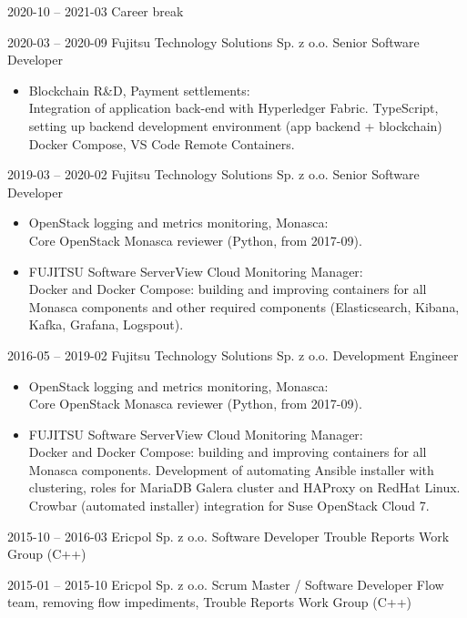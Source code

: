 \documentclass[11pt,a4paper,sans,english]{moderncv}   %
\begin{document}
\cventry
{\small2020-10 -- 2021-03}
	{Career break}{}{}{}{}

\cventry
{\small2020-03 -- 2020-09}
	{Fujitsu Technology Solutions Sp. z o.o.}{}{}
	{Senior Software Developer}
	{\begin{itemize}
		\item Blockchain R\&D, Payment settlements: \\
			Integration of application back-end with Hyperledger Fabric.
			TypeScript, setting up backend development environment (app backend
			+ blockchain) Docker Compose, VS Code Remote Containers.
	\end{itemize}}

\cventry
{\small2019-03 -- 2020-02}
	{Fujitsu Technology Solutions Sp. z o.o.}{}{}
	{Senior Software Developer}
	{\begin{itemize}
		\item  OpenStack logging and metrics monitoring, Monasca: \\
			Core OpenStack Monasca reviewer (Python, from 2017-09).
		\item  FUJITSU Software ServerView Cloud Monitoring Manager: \\
			Docker and Docker Compose: building and improving containers for
			all Monasca components and other required components
			(Elasticsearch, Kibana, Kafka, Grafana, Logspout).
	\end{itemize}}

\cventry
{\small2016-05 -- 2019-02}
	{Fujitsu Technology Solutions Sp. z o.o.}{}{}
	{Development Engineer}
	{\begin{itemize}
		\item OpenStack logging and metrics monitoring, Monasca: \\
			Core OpenStack Monasca reviewer (Python, from 2017-09).
		\item FUJITSU Software ServerView Cloud Monitoring Manager: \\
			Docker and Docker Compose: building and improving containers for
			all Monasca components. Development of automating Ansible installer
			with clustering, roles for MariaDB Galera cluster and HAProxy
			on RedHat Linux. Crowbar (automated installer) integration for
			Suse OpenStack Cloud 7.
	\end{itemize}}

\cventry
{\small2015-10 -- 2016-03}
	{Ericpol Sp. z o.o.}{}{}
	{Software Developer}
	{Trouble Reports Work Group (C++)}

\cventry
{\small2015-01 -- 2015-10}
	{Ericpol Sp. z o.o.}{}{}
	{Scrum Master / Software Developer}
	{Flow team, removing flow impediments, Trouble Reports Work Group (C++)}
\end{document}
